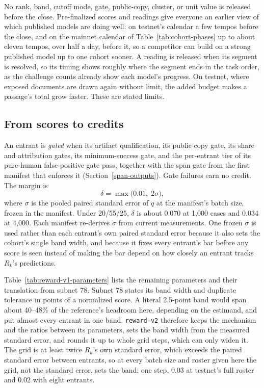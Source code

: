 No rank, band, cutoff mode, gate, public-copy, cluster, or unit value is
released before the close. Pre-finalized scores and readings give everyone an
earlier view of which published models are doing well: on testnet's calendar a
few tempos before the close, and on the mainnet calendar of
Table~\ref{tab:cohort-phases} up to about eleven tempos, over half a day,
before it, so a competitor
can build on a strong published model up to one cohort sooner. A reading is
released when its segment is resolved, so its timing shows roughly where the
segment ends in the task order, as the challenge counts already show each
model's progress. On testnet, where exposed documents are drawn again without
limit, the added budget makes a passage's total grow faster. These are stated
limits.

\subsection{From scores to credits}\label{reward-v1}

An entrant is \emph{gated} when its artifact qualification, its public-copy
gate, its share and attribution gates, its minimum-success gate, and the
per-entrant tier of its pure-human false-positive gate pass, together with the
span gate from the first manifest that enforces it
(Section~\ref{span-outputs}). Gate failures
earn no credit. The margin is
\[
 \delta=\max\bigl(0.01,\;2\sigma\bigr),
\]
where \(\sigma\) is the pooled paired standard error of \(q\) at the manifest's
batch size, frozen in the manifest. Under 20/55/25, \(\delta\) is about 0.070 at
1,000 cases and 0.034 at 4,000. Each manifest re-derives \(\sigma\) from current
measurements. One frozen \(\sigma\) is used rather than each entrant's own
paired standard error because it also sets the cohort's single band width, and
because it fixes every entrant's bar before any score is seen instead of making
the bar depend on how closely an entrant tracks \(R_k\)'s predictions.

Table~\ref{tab:reward-v1-parameters} lists the remaining parameters and their
translation from subnet 78. Subnet 78 states its band width and duplicate
tolerance in points of a normalized score. A literal 2.5-point band would span
about 40--48\% of the reference's headroom here, depending on the estimand, and
put almost every entrant in one band. \texttt{reward-v2} therefore keeps the
mechanism and the ratios between its parameters, sets the band width from the
measured standard error, and rounds it up to whole grid steps, which can only
widen it. The grid is at least twice \(R_k\)'s own standard error, which
exceeds the paired standard error between entrants, so at every batch size and
roster given here the grid, not the standard error, sets the band: one step,
0.03 at testnet's full roster and 0.02 with eight entrants.

